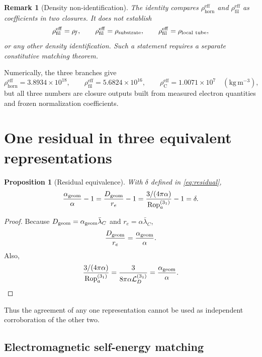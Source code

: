 \documentclass[aps,pre,preprint,notitlepage,nofootinbib,superscriptaddress]{revtex4-2}
\newcommand{\lC}{\bar\lambda_C}
\newcommand{\re}{r_e}
\newcommand{\Rop}{\operatorname{Rop}}
\newcommand{\calL}{\mathcal L}
\newcommand{\rhohorn}{\rho_{\mathrm{horn}}^{\mathrm{eff}}}
\newcommand{\rhofil}{\rho_{\mathrm{fil}}^{\mathrm{eff}}}
\newcommand{\rhoCeff}{\rho_{\mathrm C}^{\mathrm{eff}}}
\newtheorem{proposition}{Proposition}
\newtheorem{remark}{Remark}
\begin{document}
\begin{remark}[Density non-identification]
The identity compares \(\rhohorn\) and \(\rhofil\) as coefficients in two closures.  It does not establish
\[
\rhofil=\rho_{\!f},
\qquad
\rhofil=\rho_{\rm substrate},
\qquad
\rhofil=\rho_{\rm local\ tube},
\]
or any other density identification.  Such a statement requires a separate constitutive matching theorem.
\end{remark}

Numerically, the three branches give
\begin{equation}
  \rhohorn=3.8934\times10^{18},
  \qquad
  \rhofil=5.6824\times10^{16},
  \qquad
  \rhoCeff=1.0071\times10^{7}
  \quad
  (\mathrm{kg\,m^{-3}}),
  \label{eq:numerical-coefficients}
\end{equation}
but all three numbers are closure outputs built from measured electron quantities and frozen normalization coefficients.

\section{One residual in three equivalent representations}
\label{sec:residual-three}

\begin{proposition}[Residual equivalence]
\label{prop:residual}
With \(\delta\) defined in \cref{eq:residual},
\begin{equation}
  \frac{\alpha_{\rm geom}}{\alpha}-1
  =
  \frac{D_{\rm geom}}{\re}-1
  =
  \frac{3/(4\pi\alpha)}{\Rop_a^{(3_1)}}-1
  =
  \delta.
  \label{eq:three-faces}
\end{equation}
\end{proposition}

\begin{proof}
Because \(D_{\rm geom}=\alpha_{\rm geom}\lC\) and
\(\re=\alpha\lC\),
\[
\frac{D_{\rm geom}}{\re}
=
\frac{\alpha_{\rm geom}}{\alpha}.
\]
Also,
\[
\frac{3/(4\pi\alpha)}{\Rop_a^{(3_1)}}
=
\frac{3}{8\pi\alpha\calL_D^{(3_1)}}
=
\frac{\alpha_{\rm geom}}{\alpha}.
\]
\end{proof}

Thus the agreement of any one representation cannot be used as independent corroboration of the other two.

\subsection{Electromagnetic self-energy matching}
\end{document}
